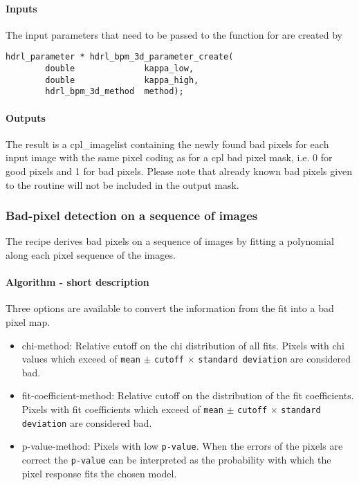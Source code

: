 \paragraph{Inputs}

The input parameters that need to be passed to the function for are
created by
\begin{lstlisting}
hdrl_parameter * hdrl_bpm_3d_parameter_create(
        double              kappa_low,
        double              kappa_high,
        hdrl_bpm_3d_method  method);
\end{lstlisting}

\paragraph{Outputs}

The result is a cpl\_imagelist containing the newly found bad pixels
for each input image with the same pixel coding as for a cpl bad
pixel mask, i.e. 0 for good pixels and 1 for bad pixels. Please note
that already known bad pixels given to the routine will not be
included in the output mask.


\subsubsection{Bad-pixel detection on a sequence of images}
The recipe derives bad pixels on a sequence of images by fitting a
polynomial along each pixel sequence of the images.

\paragraph{Algorithm - short description}

Three options are available to convert the information from the fit
into a bad pixel map.
\begin{itemize}
\item chi-method: Relative cutoff on the chi distribution of all
  fits. Pixels with chi values which exceed of \verb,mean, $\pm$
  \verb,cutoff, $\times$ \verb,standard deviation, are considered bad.
\item fit-coefficient-method: Relative cutoff on the distribution of
  the fit coefficients. Pixels with fit coefficients which exceed of
  \verb,mean, $\pm$ \verb,cutoff, $\times$ \verb,standard deviation,
  are considered bad.
\item p-value-method: Pixels with low \verb,p-value,. When the errors
  of the pixels are correct the \verb,p-value, can be interpreted as
  the probability with which the pixel response fits the chosen model.
\end{itemize}

